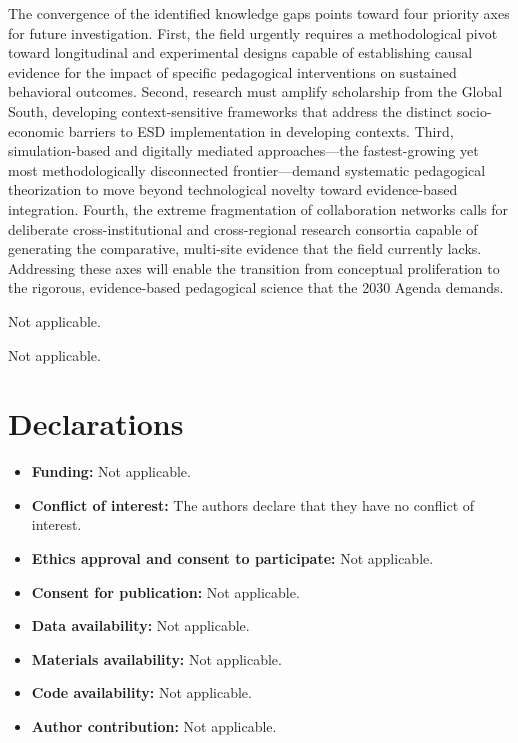 \documentclass[pdflatex,sn-basic]{sn-jnl}%
\begin{document}
The convergence of the identified knowledge gaps points toward four priority axes for future investigation. First, the field urgently requires a methodological pivot toward longitudinal and experimental designs capable of establishing causal evidence for the impact of specific pedagogical interventions on sustained behavioral outcomes. Second, research must amplify scholarship from the Global South, developing context-sensitive frameworks that address the distinct socio-economic barriers to ESD implementation in developing contexts. Third, simulation-based and digitally mediated approaches---the fastest-growing yet most methodologically disconnected frontier---demand systematic pedagogical theorization to move beyond technological novelty toward evidence-based integration. Fourth, the extreme fragmentation of collaboration networks calls for deliberate cross-institutional and cross-regional research consortia capable of generating the comparative, multi-site evidence that the field currently lacks. Addressing these axes will enable the transition from conceptual proliferation to the rigorous, evidence-based pedagogical science that the 2030 Agenda demands.


\backmatter


Not applicable.


Not applicable.

\section*{Declarations}

\begin{itemize}
\item \textbf{Funding:} Not applicable.
\item \textbf{Conflict of interest:} The authors declare that they have no conflict of interest.
\item \textbf{Ethics approval and consent to participate:} Not applicable.
\item \textbf{Consent for publication:} Not applicable.
\item \textbf{Data availability:} Not applicable.
\item \textbf{Materials availability:} Not applicable.
\item \textbf{Code availability:} Not applicable.
\item \textbf{Author contribution:} Not applicable.
\end{itemize}



\end{document}
